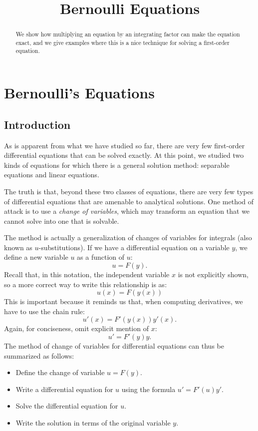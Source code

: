\documentclass{ximera}
\title{Bernoulli Equations}
\begin{document}
\begin{abstract}
We show how multiplying an equation by an integrating factor can make the equation exact, and we give examples where this is a nice technique for solving a first-order equation.
\end{abstract}

\maketitle

\section*{Bernoulli's Equations}

\subsection*{Introduction}
As is apparent from what we have studied so far, there are very few first-order differential equations that can be solved exactly. At this point, we studied two kinds of equations for which there is a general solution method: separable equations and linear equations.

The truth is that, beyond these two classes of equations, there are very few types of differential equations that are amenable to analytical solutions. One method of attack is to use a \textit{change of variables}, which may transform an equation that we cannot solve into one that is solvable.

The method is actually a generalization of changes of variables for integrals (also known as $u$-substitutions). If we have a differential equation on a variable $y$, we define a new variable $u$ as a function of $u$:
\[
u=F(y).
\]
Recall that, in this notation, the independent variable $x$ is not explicitly shown, so a more correct way to write this relationship is as:
\[
u(x)=F(y(x))
\]
This is important because it reminds us that, when computing derivatives, we have to use the chain rule:
\[
u'(x)=F'(y(x))y'(x).
\]
Again, for conciseness, omit explicit mention of $x$:
\[
u'=F'(y)y.
\]
The method of change of variables for differential equations can thus be summarized as follows:

\begin{itemize}
\item Define the change of variable $u=F(y)$.
\item Write a differential equation for $u$ using the formula $u'=F'(u)y'$.
\item Solve the differential equation for $u$.
\item Write the solution in terms of the original variable $y$.
\end{itemize}
\end{document}
